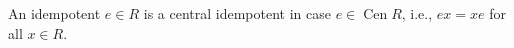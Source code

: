 An idempotent $e \in R$ is a central idempotent in case $e \in \operatorname{Cen} R$, i.e., $ex = xe$ for all $x \in R$.
